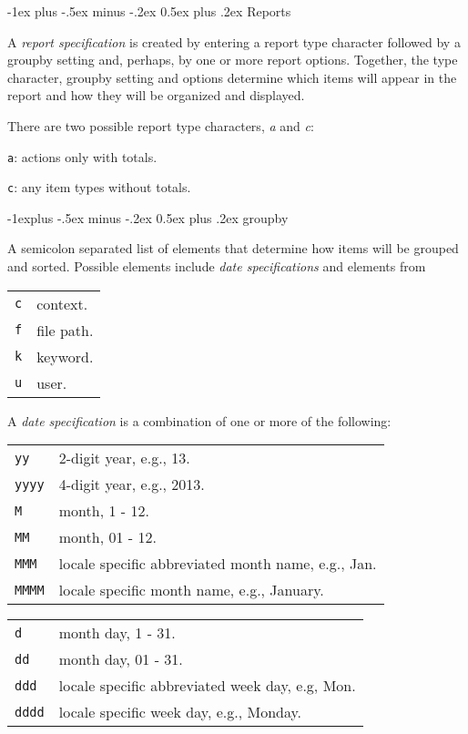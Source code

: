 \documentclass[10pt,landscape]{article}
\makeatletter
\renewcommand{\section}{\@startsection{section}{1}{0mm}%
                                {-1ex plus -.5ex minus -.2ex}%
                                {0.5ex plus .2ex}%
                                {\normalfont\large\bfseries}}
\renewcommand{\subsection}{\@startsection{subsection}{2}{0mm}%
                                {-1explus -.5ex minus -.2ex}%
                                {0.5ex plus .2ex}%
                                {\normalfont\normalsize\bfseries}}
\makeatother
\begin{document}
\begin{multicols}{3}
\section{Reports}

A \emph{report specification} is created by entering a report type character followed by a groupby setting and, perhaps, by one or more report options. Together, the type character, groupby setting and options determine which items will appear in the report and how they will be organized and displayed.

\vskip 3pt
There are two possible report type characters, \emph{a} and \emph{c}:

\begin{compactdesc}
\item[\texttt{a}:] actions only with totals.
\item[\texttt{c}:] any item types without totals.
\end{compactdesc}

\subsection{groupby}

A semicolon separated list of elements that determine how items will be grouped and sorted. Possible elements include \emph{date specifications} and elements from

\begin{tabular}{@{}ll@{}}
\texttt{c} & context. \\
\texttt{f} & file path. \\
\texttt{k} & keyword. \\
\texttt{u} & user. \\
\end{tabular}

\vskip3pt
A \emph{date specification} is a combination of one or more of the following:
\vskip3pt

\begin{tabular}{@{}ll@{}}
\texttt{yy} & 2-digit year, e.g., 13. \\
\texttt{yyyy} & 4-digit year, e.g., 2013. \\
\texttt{M} & month, 1 - 12. \\
\texttt{MM} & month, 01 - 12. \\
\texttt{MMM} & locale specific abbreviated month name, e.g., Jan. \\
\texttt{MMMM} & locale specific month name, e.g., January. \\
\end{tabular}
\begin{tabular}{@{}ll@{}}
\texttt{d} & month day, 1 - 31. \\
\texttt{dd} & month day, 01 - 31. \\
\texttt{ddd} & locale specific abbreviated week day, e.g, Mon. \\
\texttt{dddd} & locale specific week day, e.g., Monday. \\
\end{tabular}


\end{multicols}
\end{document}

